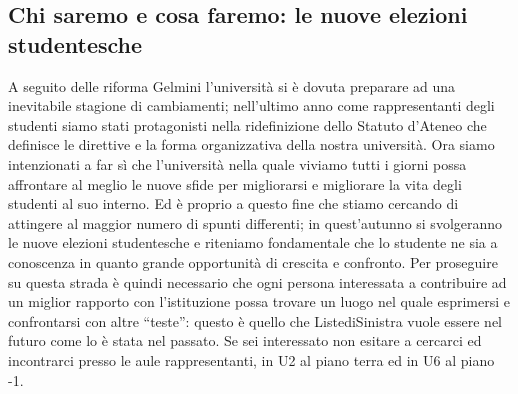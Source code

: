 \subsection{Chi saremo e cosa faremo: le nuove elezioni studentesche}
A seguito delle riforma Gelmini l'università si è dovuta preparare ad una inevitabile stagione di cambiamenti; nell'ultimo anno come rappresentanti degli studenti siamo stati protagonisti nella ridefinizione dello Statuto d'Ateneo che definisce le direttive e la forma organizzativa della nostra università. Ora siamo intenzionati a far sì che l'università nella quale viviamo tutti i giorni possa affrontare al meglio le nuove sfide per migliorarsi e migliorare la vita degli studenti al suo interno.
Ed è proprio a questo fine che stiamo cercando di attingere al maggior numero di spunti differenti; in quest'autunno si svolgeranno le nuove elezioni studentesche e riteniamo fondamentale che lo studente ne sia a conoscenza in quanto grande opportunità di crescita e confronto.
Per proseguire su questa strada è quindi necessario che ogni persona interessata a contribuire ad un miglior rapporto con l'istituzione possa trovare un luogo nel quale esprimersi e confrontarsi con altre “teste”: questo è quello che ListediSinistra vuole essere nel futuro come lo è stata nel passato. Se sei interessato non esitare a cercarci ed incontrarci presso le aule rappresentanti, in U2 al piano terra ed in U6 al piano -1.

